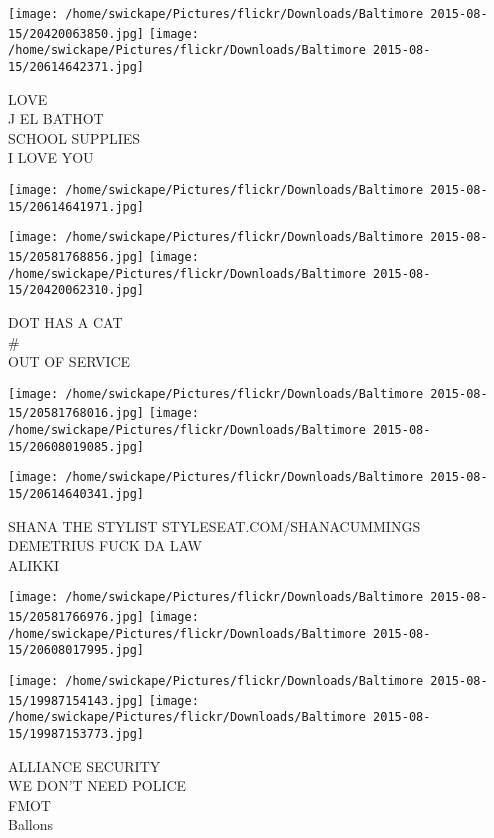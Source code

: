 \documentclass[10pt,letterpaper]{article}
\begin{document}
\texttt{[image: /home/swickape/Pictures/flickr/Downloads/Baltimore 2015-08-15/20420063850.jpg]}
\texttt{[image: /home/swickape/Pictures/flickr/Downloads/Baltimore 2015-08-15/20614642371.jpg]}

LOVE\\
J EL BATHOT\\
SCHOOL SUPPLIES\\
I LOVE YOU\\
\pagebreak

\texttt{[image: /home/swickape/Pictures/flickr/Downloads/Baltimore 2015-08-15/20614641971.jpg]}

\vspace{0.25in}
\texttt{[image: /home/swickape/Pictures/flickr/Downloads/Baltimore 2015-08-15/20581768856.jpg]}
\texttt{[image: /home/swickape/Pictures/flickr/Downloads/Baltimore 2015-08-15/20420062310.jpg]}

DOT HAS A CAT\\
\#\\
OUT OF SERVICE\\
\pagebreak

\texttt{[image: /home/swickape/Pictures/flickr/Downloads/Baltimore 2015-08-15/20581768016.jpg]}
\texttt{[image: /home/swickape/Pictures/flickr/Downloads/Baltimore 2015-08-15/20608019085.jpg]}

\vspace{0.25in}
\texttt{[image: /home/swickape/Pictures/flickr/Downloads/Baltimore 2015-08-15/20614640341.jpg]}

SHANA THE STYLIST STYLESEAT.COM/SHANACUMMINGS\\
DEMETRIUS FUCK DA LAW\\
ALIKKI\\
\pagebreak

\texttt{[image: /home/swickape/Pictures/flickr/Downloads/Baltimore 2015-08-15/20581766976.jpg]}
\texttt{[image: /home/swickape/Pictures/flickr/Downloads/Baltimore 2015-08-15/20608017995.jpg]}

\texttt{[image: /home/swickape/Pictures/flickr/Downloads/Baltimore 2015-08-15/19987154143.jpg]}
\texttt{[image: /home/swickape/Pictures/flickr/Downloads/Baltimore 2015-08-15/19987153773.jpg]}

ALLIANCE SECURITY\\
WE DON'T NEED POLICE\\
FMOT\\
Ballons\\
\pagebreak
\end{document}
